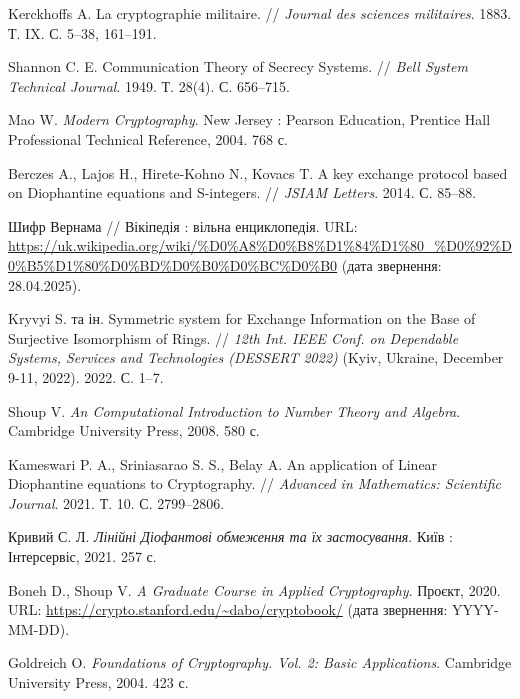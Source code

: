 \clearpage
{}
{}

\begin{thebibliography}{XX}

    Kerckhoffs A. La cryptographie militaire. // \textit{Journal des sciences militaires}. 1883. Т. IX. С. 5--38, 161--191.

    Shannon C. E. Communication Theory of Secrecy Systems. // \textit{Bell System Technical Journal}. 1949. Т. 28(4). С. 656--715.

    Mao W. \textit{Modern Cryptography}. New Jersey : Pearson Education, Prentice Hall Professional Technical Reference, 2004. 768 с.

    Berczes A., Lajos H., Hirete-Kohno N., Kovacs T. A key exchange protocol based on Diophantine equations and S-integers. // \textit{JSIAM Letters}. 2014. С. 85--88.

    Шифр Вернама // Вікіпедія : вільна енциклопедія. URL: \url{https://uk.wikipedia.org/wiki/%D0%A8%D0%B8%D1%84%D1%80_%D0%92%D0%B5%D1%80%D0%BD%D0%B0%D0%BC%D0%B0} (дата звернення: 28.04.2025).

    Kryvyi S. та ін. Symmetric system for Exchange Information on the Base of Surjective Isomorphism of Rings. // \textit{12th Int. IEEE Conf. on Dependable Systems, Services and Technologies (DESSERT 2022)} (Kyiv, Ukraine, December 9-11, 2022). 2022. С. 1--7.

    Shoup V. \textit{An Computational Introduction to Number Theory and Algebra}. Cambridge University Press, 2008. 580 с.

    Kameswari P. A., Sriniasarao S. S., Belay A. An application of Linear Diophantine equations to Cryptography. // \textit{Advanced in Mathematics: Scientific Journal}. 2021. Т. 10. С. 2799--2806.

    Кривий С. Л. \textit{Лінійні Діофантові обмеження та їх застосування}. Київ : Інтерсервіс, 2021. 257 с.

    Boneh D., Shoup V. \textit{A Graduate Course in Applied Cryptography}. Проєкт, 2020. URL: \url{https://crypto.stanford.edu/~dabo/cryptobook/} (дата звернення: YYYY-MM-DD).

    Goldreich O. \textit{Foundations of Cryptography. Vol. 2: Basic Applications}. Cambridge University Press, 2004. 423 с.


\end{thebibliography}
